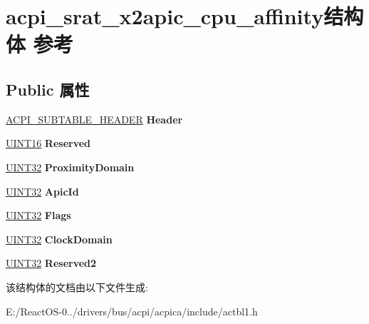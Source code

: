 \hypertarget{structacpi__srat__x2apic__cpu__affinity}{}\section{acpi\+\_\+srat\+\_\+x2apic\+\_\+cpu\+\_\+affinity结构体 参考}
\label{structacpi__srat__x2apic__cpu__affinity}
\subsection*{Public 属性}
\begin{DoxyCompactItemize}
\item 
\mbox{\label{structacpi__srat__x2apic__cpu__affinity_ab44b489117e8ab2843a399433bf01dff}} 
\hyperlink{structacpi__subtable__header}{A\+C\+P\+I\+\_\+\+S\+U\+B\+T\+A\+B\+L\+E\+\_\+\+H\+E\+A\+D\+ER} {\bfseries Header}
\item 
\mbox{\label{structacpi__srat__x2apic__cpu__affinity_adb5a7d8810b70c5f8d2a0d6fc0a2198f}} 
\hyperlink{_processor_bind_8h_a09f1a1fb2293e33483cc8d44aefb1eb1}{U\+I\+N\+T16} {\bfseries Reserved}
\item 
\mbox{\label{structacpi__srat__x2apic__cpu__affinity_a555d9018f714f87b56a63503ac986ea3}} 
\hyperlink{_processor_bind_8h_ae1e6edbbc26d6fbc71a90190d0266018}{U\+I\+N\+T32} {\bfseries Proximity\+Domain}
\item 
\mbox{\label{structacpi__srat__x2apic__cpu__affinity_aebd15521bc5715221bdc207867ff8dbe}} 
\hyperlink{_processor_bind_8h_ae1e6edbbc26d6fbc71a90190d0266018}{U\+I\+N\+T32} {\bfseries Apic\+Id}
\item 
\mbox{\label{structacpi__srat__x2apic__cpu__affinity_aa386dede105a4d8c2958417d00630146}} 
\hyperlink{_processor_bind_8h_ae1e6edbbc26d6fbc71a90190d0266018}{U\+I\+N\+T32} {\bfseries Flags}
\item 
\mbox{\label{structacpi__srat__x2apic__cpu__affinity_a570cffb14e4fa35d7e768b514c816d53}} 
\hyperlink{_processor_bind_8h_ae1e6edbbc26d6fbc71a90190d0266018}{U\+I\+N\+T32} {\bfseries Clock\+Domain}
\item 
\mbox{\label{structacpi__srat__x2apic__cpu__affinity_afb161e857936c838eb8c8c206fea8b84}} 
\hyperlink{_processor_bind_8h_ae1e6edbbc26d6fbc71a90190d0266018}{U\+I\+N\+T32} {\bfseries Reserved2}
\end{DoxyCompactItemize}


该结构体的文档由以下文件生成\+:\begin{DoxyCompactItemize}
\item 
E\+:/\+React\+O\+S-\/0../drivers/bus/acpi/acpica/include/actbl1.\+h\end{DoxyCompactItemize}
